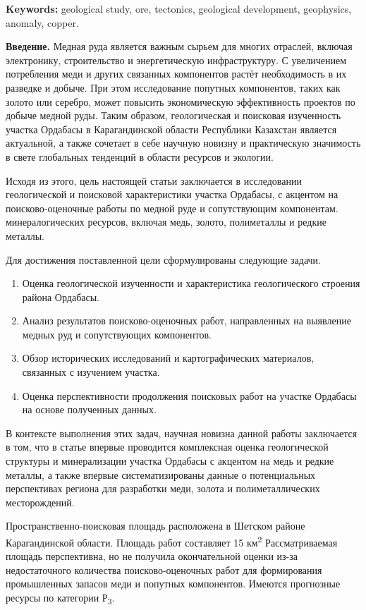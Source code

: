 {\bfseries Keywords:} geological study, ore, tectonics, geological
development, geophysics, anomaly, copper.

{\bfseries Введение.} Медная руда является важным сырьем для многих
отраслей, включая электронику, строительство и энергетическую
инфраструктуру. С увеличением потребления меди и других связанных
компонентов растёт необходимость в их разведке и добыче. При этом
исследование попутных компонентов, таких как золото или серебро, может
повысить экономическую эффективность проектов по добыче медной руды.
Таким образом, геологическая и поисковая изученность участка Ордабасы в
Карагандинской области Республики Казахстан является актуальной, а также
сочетает в себе научную новизну и практическую значимость в свете
глобальных тенденций в области ресурсов и экологии.

Исходя из этого, цель настоящей статьи заключается в исследовании
геологической и поисковой характеристики участка Ордабасы, с акцентом на
поисково-оценочные работы по медной руде и сопутствующим компонентам.
минералогических ресурсов, включая медь, золото, полиметаллы и редкие
металлы.

Для достижения поставленной цели сформулированы следующие задачи.

\begin{enumerate}
\def\labelenumi{\arabic{enumi}.}
\item
  Оценка геологической изученности и характеристика геологического
  строения района Ордабасы.
\item
  Анализ результатов поисково-оценочных работ, направленных на выявление
  медных руд и сопутствующих компонентов.
\item
  Обзор исторических исследований и картографических материалов,
  связанных с изучением участка.
\item
  Оценка перспективности продолжения поисковых работ на участке Ордабасы
  на основе полученных данных.
\end{enumerate}

В контексте выполнения этих задач, научная новизна данной работы
заключается в том, что в статье впервые проводится комплексная оценка
геологической структуры и минерализации участка Ордабасы с акцентом на
медь и редкие металлы, а также впервые систематизированы данные о
потенциальных перспективах региона для разработки меди, золота и
полиметаллических месторождений.

Пространственно-поисковая площадь расположена в Шетском районе
Карагандинской области. Площадь работ составляет 15
км\textsuperscript{2} Рассматриваемая площадь перспективна, но не
получила окончательной оценки из-за недостаточного количества
поисково-оценочных работ для формирования промышленных запасов меди и
попутных компонентов. Имеются прогнозные ресурсы по категории
Р\textsubscript{3}.

